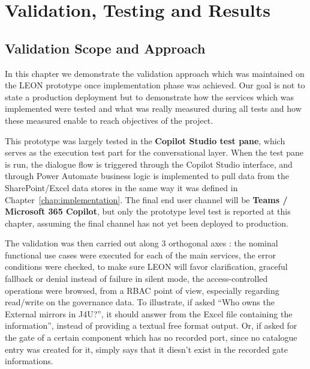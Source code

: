 
\chapter{Validation, Testing and Results}
\label{chap:results}

\section{\textcolor[HTML]{0066CC}{Validation Scope and Approach}}

In this chapter we demonstrate the validation approach which was maintained on the LEON prototype once implementation phase was achieved. Our goal is not to state a production deployment but to demonstrate how the services which was implemented were tested and what was really measured during all tests and how these measured enable to reach objectives of the project.

This prototype was largely tested in the \textbf{Copilot Studio test pane}, which serves as the execution test part for the conversational layer. When the test pane is run, the dialogue flow is triggered through the Copilot Studio interface, and through Power Automate business logic is implemented to pull data from the SharePoint/Excel data stores in the same way it was defined in Chapter~\ref{chap:implementation}. The final end user channel will be \textbf{Teams / Microsoft 365 Copilot}, but only the prototype level test is reported at this chapter, assuming the final channel has not yet been deployed to production.

The validation was then carried out along 3 orthogonal axes : the nominal functional use cases were executed for each of the main services, the error conditions were checked, to make sure LEON will favor clarification, graceful fallback or denial instead of failure in silent mode, the access-controlled operations were browsed, from a RBAC point of view, especially regarding read/write on the governance data. To illustrate, if asked “Who owns the External mirrors in J4U?”, it should answer from the Excel file containing the information”, instead of providing a textual free format output. Or, if asked for the gate of a certain component which has no recorded port, since no catalogue entry was created for it, simply says that it diesn't exist in the recorded gate informations.

